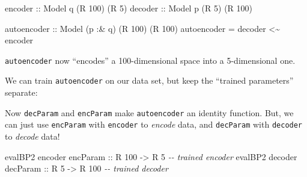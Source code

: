 \documentclass[]{article}
\newenvironment{Shaded}{}{}
\newcommand{\CommentTok}[1]{\textcolor[rgb]{0.38,0.63,0.69}{\textit{#1}}}
\newcommand{\DataTypeTok}[1]{\textcolor[rgb]{0.56,0.13,0.00}{#1}}
\newcommand{\DecValTok}[1]{\textcolor[rgb]{0.25,0.63,0.44}{#1}}
\newcommand{\FunctionTok}[1]{\textcolor[rgb]{0.02,0.16,0.49}{#1}}
\newcommand{\NormalTok}[1]{#1}
\newcommand{\OperatorTok}[1]{\textcolor[rgb]{0.40,0.40,0.40}{#1}}
\newcommand{\OtherTok}[1]{\textcolor[rgb]{0.00,0.44,0.13}{#1}}
\begin{document}
\begin{Shaded}
\begin{Highlighting}[]
\OtherTok{encoder ::} \DataTypeTok{Model}\NormalTok{ q (}\DataTypeTok{R} \DecValTok{100}\NormalTok{) (}\DataTypeTok{R} \DecValTok{5}\NormalTok{)}
\OtherTok{decoder ::} \DataTypeTok{Model}\NormalTok{ p (}\DataTypeTok{R} \DecValTok{5}\NormalTok{)   (}\DataTypeTok{R} \DecValTok{100}\NormalTok{)}

\OtherTok{autoencoder ::} \DataTypeTok{Model}\NormalTok{ (p }\OperatorTok{:\&}\NormalTok{ q) (}\DataTypeTok{R} \DecValTok{100}\NormalTok{) (}\DataTypeTok{R} \DecValTok{100}\NormalTok{)}
\NormalTok{autoencoder }\OtherTok{=}\NormalTok{ decoder }\OperatorTok{\textless{}\textasciitilde{}}\NormalTok{ encoder}
\end{Highlighting}
\end{Shaded}

\texttt{autoencoder} now ``encodes'' a 100-dimensional space into a
5-dimensional one.

We can train \texttt{autoencoder} on our data set, but keep the ``trained
parameters'' separate:

\begin{Shaded}
\end{Shaded}

Now \texttt{decParam} and \texttt{encParam} make \texttt{autoencoder} an
identity function. But, we can just use \texttt{encParam} with \texttt{encoder}
to \emph{encode} data, and \texttt{decParam} with \texttt{decoder} to
\emph{decode} data!

\begin{Shaded}
\begin{Highlighting}[]
\NormalTok{evalBP2 encoder}\OtherTok{ encParam ::} \DataTypeTok{R} \DecValTok{100} \OtherTok{{-}\textgreater{}} \DataTypeTok{R} \DecValTok{5}        \CommentTok{{-}{-} trained encoder}
\NormalTok{evalBP2 decoder}\OtherTok{ decParam ::} \DataTypeTok{R} \DecValTok{5}   \OtherTok{{-}\textgreater{}} \DataTypeTok{R} \DecValTok{100}      \CommentTok{{-}{-} trained decoder}
\end{Highlighting}
\end{Shaded}
\end{document}
